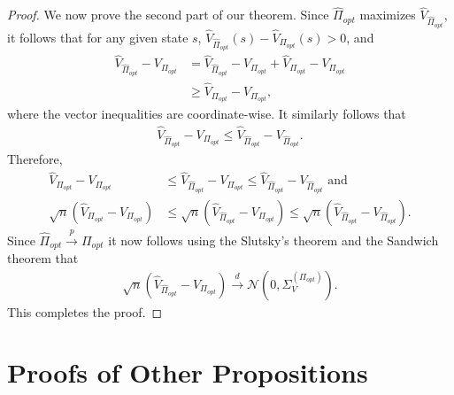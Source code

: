 \documentclass[twoside,11pt]{article}
\newcommand{\pow}[1]{^{(#1)}}%
\numberwithin{equation}{section}
\newcommand{\lp}{\left(}
\newcommand{\rp}{\right)}
\newcommand{\Ncal}{\mathcal{N}}
\begin{document}
\begin{proof}
    We now prove the second part of our theorem. Since $\hat \Pi_{opt}$ maximizes $\hat V_{\hat \Pi_{opt}}$, it follows that for any given state $s$, $\hat V_{\hat \Pi_{opt}}(s)-\hat V_{\Pi_{opt}}(s)>0$, and
    \begin{align*}
        \hat V_{\hat \Pi_{opt}}-V_{\Pi_{opt}} & = \hat V_{\hat \Pi_{opt}}-\hat V_{\Pi_{opt}}+\hat V_{\Pi_{opt}}-V_{\Pi_{opt}}\\
        & \geq \hat V_{\Pi_{opt}}-V_{\Pi_{opt}},
    \end{align*}
    where the vector inequalities are coordinate-wise. It similarly follows that
    \begin{align*}
        \hat V_{\hat \Pi_{opt}}-V_{\Pi_{opt}} \leq \hat V_{\hat \Pi_{opt}}-V_{\hat \Pi_{opt}}. 
    \end{align*}
    Therefore, 
    \begin{align*}
         \hat V_{\Pi_{opt}}-V_{\Pi_{opt}}&\leq  \hat V_{\hat \Pi_{opt}}-V_{\Pi_{opt}}\leq \hat V_{\hat \Pi_{opt}}-V_{\hat \Pi_{opt}} \text{ and }\\
         \sqrt{n}\lp\hat V_{\Pi_{opt}}-V_{\Pi_{opt}}\rp&\leq  \sqrt{n}\lp\hat V_{\hat \Pi_{opt}}-V_{\Pi_{opt}}\rp\leq \sqrt{n}\lp \hat V_{\hat \Pi_{opt}}-V_{\hat \Pi_{opt}}\rp.
    \end{align*}
    Since $\hat \Pi_{opt}\overset{p}{\rightarrow}\Pi_{opt}$ it now follows using the Slutsky's theorem and the Sandwich theorem that
    \begin{align*}
         \sqrt{n}\lp\hat V_{\hat \Pi_{opt}}-V_{\Pi_{opt}}\rp\overset{d}{\rightarrow}\Ncal\lp 0,\Sigma_V\pow{\Pi_{opt}} \rp.
    \end{align*}
    This completes the proof.
\end{proof}
\section{Proofs of Other Propositions}
\end{document}
